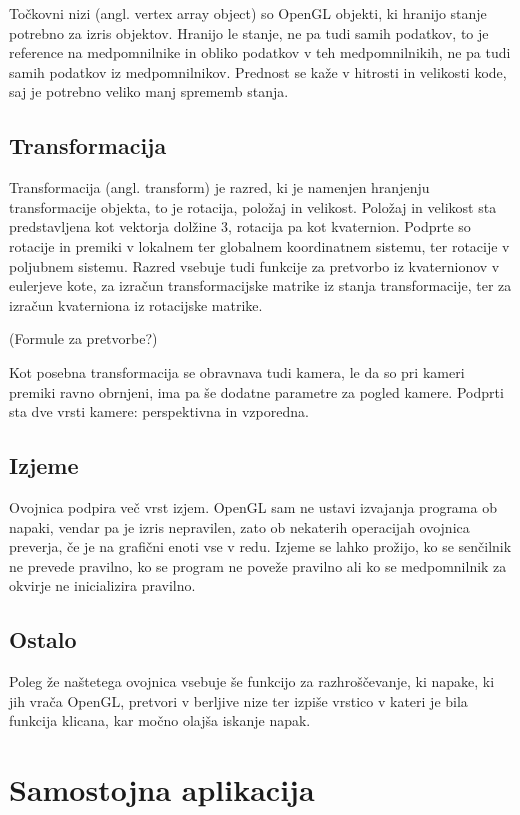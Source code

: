 \documentclass[a4paper, 12pt]{book}
\begin{document}
Točkovni nizi (angl. vertex array object) so OpenGL objekti, ki hranijo stanje potrebno za izris objektov. Hranijo le stanje, ne pa tudi samih podatkov, to je reference na medpomnilnike in obliko podatkov v teh medpomnilnikih, ne pa tudi samih podatkov iz medpomnilnikov. Prednost se kaže v hitrosti in velikosti kode, saj je potrebno veliko manj sprememb stanja.

\subsection*{Transformacija}

Transformacija (angl. transform) je razred, ki je namenjen hranjenju transformacije objekta, to je rotacija, položaj in velikost. Položaj in velikost sta predstavljena kot vektorja dolžine 3, rotacija pa kot kvaternion. Podprte so rotacije in premiki v lokalnem ter globalnem koordinatnem sistemu, ter rotacije v poljubnem sistemu. Razred vsebuje tudi funkcije za pretvorbo iz kvaternionov v eulerjeve kote, za izračun transformacijske matrike iz stanja transformacije, ter za izračun kvaterniona iz rotacijske matrike.

(Formule za pretvorbe?)

Kot posebna transformacija se obravnava tudi kamera, le da so pri kameri premiki ravno obrnjeni, ima pa še dodatne parametre za pogled kamere. Podprti sta dve vrsti kamere: perspektivna in vzporedna.
\subsection*{Izjeme}
Ovojnica podpira več vrst izjem. OpenGL sam ne ustavi izvajanja programa ob napaki, vendar pa je izris nepravilen, zato ob nekaterih operacijah ovojnica preverja, če je na grafični enoti vse v redu. Izjeme se lahko prožijo, ko se senčilnik ne prevede pravilno, ko se program ne poveže pravilno ali ko se medpomnilnik za okvirje ne inicializira pravilno.

\subsection*{Ostalo}

Poleg že naštetega ovojnica vsebuje še funkcijo za razhroščevanje, ki napake, ki jih vrača OpenGL, pretvori v berljive nize ter izpiše vrstico v kateri je bila funkcija klicana, kar močno olajša iskanje napak.

\section{Samostojna aplikacija}
\end{document}
